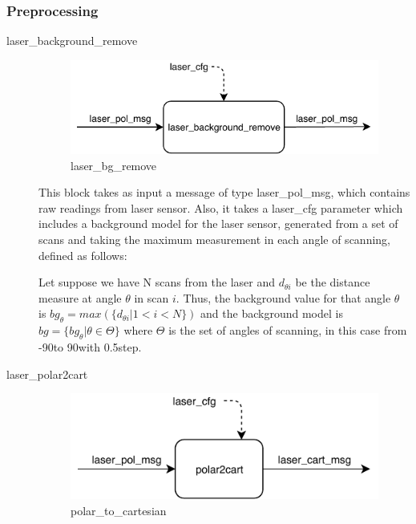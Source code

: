 \subsubsection{Preprocessing}
\begin{description}
\item[laser\_background\_remove] \hfill

\begin{figure}[ht!]
\centering
\includegraphics[scale=1]{fig/3/laser_bg_remove.pdf}
\caption{laser\_bg\_remove}
\label{laser_bg_remove}
\end{figure}

This block takes as input a message of type laser\_pol\_msg, which contains raw readings from laser sensor. Also, it takes a laser\_cfg parameter which includes a background model for the laser sensor, generated from a set of scans and taking the maximum measurement in each angle of scanning, defined as follows:

Let suppose we have N scans from the laser and $d_{\theta i}$ be the distance measure at angle $\theta$ in scan $i$. Thus, the background value for that angle $\theta$ is $bg_\theta = max( \{d_{\theta i} | 1 < i < N\})$ and the background model is $bg = \{bg_\theta | \theta \in \Theta\} $ where $\Theta$ is the set of angles of scanning, in this case from -90\degree to 90\degree with 0.5\degree step.

\item[laser\_polar2cart] \hfill

\begin{figure}[ht!]
\centering
\includegraphics[scale=1]{fig/3/polar2cart.pdf}
\caption{polar\_to\_cartesian}
\label{polar_to_cartesian}
\end{figure}


\end{description}
